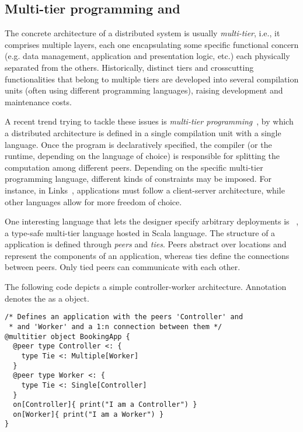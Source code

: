 \subsection{Multi-tier programming and \scalaloci{}}

The concrete architecture of a distributed system is usually \emph{multi-tier}, i.e.,
 it comprises multiple layers, each one encapsulating some specific functional concern 
 (e.g. data management, application and presentation logic, etc.)
 each physically separated from the others.
%
Historically, distinct tiers and crosscutting functionalities that belong to multiple tiers are developed into several compilation units 
(often using different programming languages), 
raising development and maintenance costs.

A recent trend trying to tackle these issues is \emph{multi-tier programming}~\cite{DBLP:journals/csur/WeisenburgerWS20},
by which a distributed architecture is defined in a single compilation unit with a single language.
%
Once the program is declaratively specified,
the compiler (or the runtime, depending on the language of choice) is responsible for
splitting the computation among different peers.
%
Depending on the specific multi-tier programming language,
different kinds of constraints may be imposed.
%
For instance, in Links~\cite{DBLP:conf/fmco/CooperLWY06},
applications must follow a client-server architecture,
while other languages allow for more freedom of choice.

One interesting language that lets the designer specify arbitrary deployments is \scalaloci{}~\cite{Weisenburger.2018, DBLP:conf/ecoop/WeisenburgerS19, DBLP:journals/programming/WeisenburgerS20},
a type-safe multi-tier language hosted in Scala language.
%
The structure of a \scalaloci{} application is defined through \textit{peers} and \textit{ties}.
%
Peers abstract over locations and represent the components
 of an application,
whereas ties define the connections between peers. Only tied peers can communicate with each other.

The following code depicts a simple controller-worker architecture.
%
Annotation  denotes the  as a \scalaloci{} object. 

\begin{verbatim}
/* Defines an application with the peers 'Controller' and 
 * and 'Worker' and a 1:n connection between them */
@multitier object BookingApp {
  @peer type Controller <: { 
    type Tie <: Multiple[Worker] 
  }
  @peer type Worker <: { 
    type Tie <: Single[Controller] 
  }
  on[Controller]{ print("I am a Controller") }
  on[Worker]{ print("I am a Worker") }
}
\end{verbatim}

